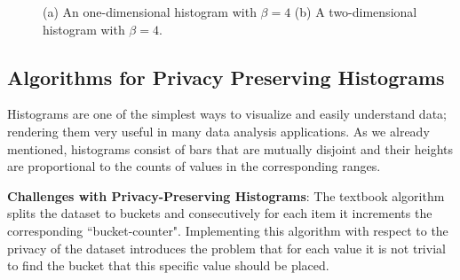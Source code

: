 \begin{figure}[h!]
    \centering

    \caption{(a) An one-dimensional histogram with $\beta = 4$
    (b) A two-dimensional histogram with $\beta = 4$.}
    \label{f:simple-hist}
\end{figure}





\subsection{Algorithms for Privacy Preserving Histograms}\label{ss:histogram-algos}
Histograms are one of the simplest ways to visualize and easily understand data; rendering them very useful in many data analysis applications.
As we already mentioned, histograms consist of bars that are mutually disjoint and their heights are proportional to the counts of values in the corresponding ranges.

\textbf{Challenges with Privacy-Preserving Histograms}: The textbook algorithm splits the dataset to buckets and consecutively for each item it increments the corresponding ``bucket-counter".
Implementing this algorithm with respect to the privacy of the dataset introduces the problem that for each value it is not trivial to find the bucket that this specific value should be placed.

